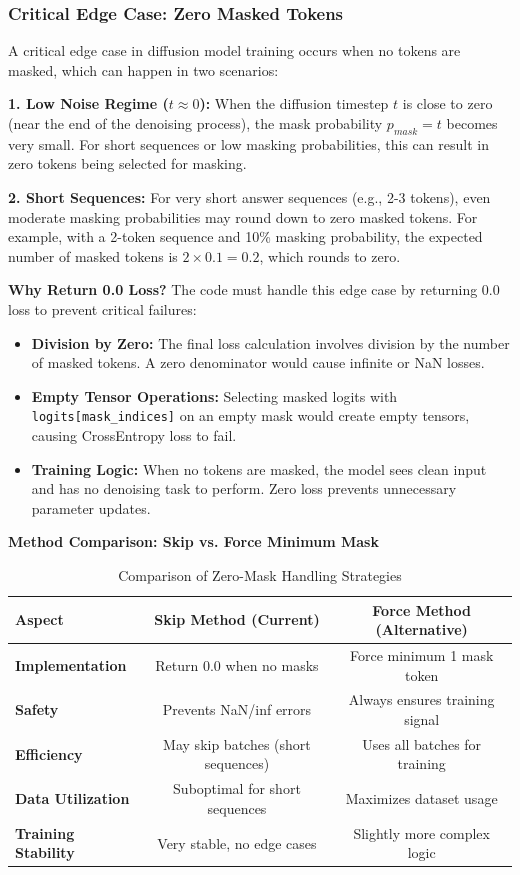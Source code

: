 \documentclass[a4paper,12pt]{article}
\begin{document}
\subsubsection*{Critical Edge Case: Zero Masked Tokens}
A critical edge case in diffusion model training occurs when no tokens are masked, which can happen in two scenarios:

\textbf{1. Low Noise Regime ($t \approx 0$):}
When the diffusion timestep $t$ is close to zero (near the end of the denoising process), the mask probability $p_{mask} = t$ becomes very small. For short sequences or low masking probabilities, this can result in zero tokens being selected for masking.

\textbf{2. Short Sequences:}
For very short answer sequences (e.g., 2-3 tokens), even moderate masking probabilities may round down to zero masked tokens. For example, with a 2-token sequence and 10\% masking probability, the expected number of masked tokens is $2 \times 0.1 = 0.2$, which rounds to zero.

\textbf{Why Return 0.0 Loss?}
The code must handle this edge case by returning 0.0 loss to prevent critical failures:

\begin{itemize}
    \item \textbf{Division by Zero:} The final loss calculation involves division by the number of masked tokens. A zero denominator would cause infinite or NaN losses.
    \item \textbf{Empty Tensor Operations:} Selecting masked logits with \texttt{logits[mask\_indices]} on an empty mask would create empty tensors, causing CrossEntropy loss to fail.
    \item \textbf{Training Logic:} When no tokens are masked, the model sees clean input and has no denoising task to perform. Zero loss prevents unnecessary parameter updates.
\end{itemize}

\textbf{Method Comparison: Skip vs. Force Minimum Mask}

\begin{table}[H]
    \centering
    \begin{tabular}{lcc}
        \toprule
        \textbf{Aspect} & \textbf{Skip Method (Current)} & \textbf{Force Method (Alternative)} \\
        \midrule
        \textbf{Implementation} & Return 0.0 when no masks & Force minimum 1 mask token \\
        \textbf{Safety} & Prevents NaN/inf errors & Always ensures training signal \\
        \textbf{Efficiency} & May skip batches (short sequences) & Uses all batches for training \\
        \textbf{Data Utilization} & Suboptimal for short sequences & Maximizes dataset usage \\
        \textbf{Training Stability} & Very stable, no edge cases & Slightly more complex logic \\
        \bottomrule
    \end{tabular}
    \caption{Comparison of Zero-Mask Handling Strategies}
\end{table}
\end{document}
